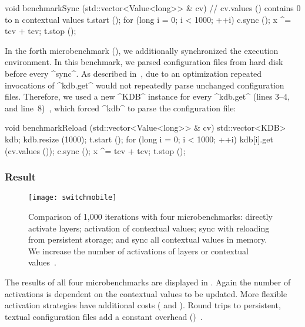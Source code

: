 \begin{code}[language=Cpp]
void benchmarkSync (std::vector<Value<long>> & cv)
{
	// cv.values () contains 0 to n contextual values
	t.start ();
	for (long i = 0; i < 1000; ++i)
	{
		c.sync ();
		x ^= tcv + tcv;
	}
	t.stop ();
}
\end{code}

In the forth microbenchmark (), we additionally synchronized the execution environment.
In this benchmark, we parsed configuration files from hard disk before every ^sync^.
As described in~, due to an optimization repeated invocations of ^kdb.get^ would not repeatedly parse unchanged configuration files.
Therefore, we used a new ^KDB^ instance for every ^kdb.get^ (lines 3--4, and line~8)~\cite{raab2016persistent}, which forced ^kdb^ to parse the configuration file:

\begin{code}[language=Cpp]
void benchmarkReload (std::vector<Value<long>> & cv)
{
	std::vector<KDB> kdb;
	kdb.resize (1000);
	t.start ();
	for (long i = 0; i < 1000; ++i)
	{
		kdb[i].get (cv.values ());
		c.sync ();
		x ^= tcv + tcv;
	}
	t.stop ();
}
\end{code}



\subsubsection{Result}

\begin{figure}[htp]
\centering
\texttt{[image: switchmobile]}
\caption[Comparison of context changes.]{Comparison of 1,000 iterations with four microbenchmarks:
 directly activate layers;
 activation of contextual values;
 sync with reloading from persistent storage; and
 sync all contextual values in memory.
We increase the number of activations of layers or contextual values~\cite{raab2016persistent}.}
\label{fig:switchmobile}
\end{figure}

The results of all four microbenchmarks are displayed in .
Again the number of activations is dependent on the contextual values to be updated.
More flexible activation strategies have additional costs ( and ).
Round trips to persistent, textual configuration files add a constant overhead ()~\cite{raab2016persistent}.

